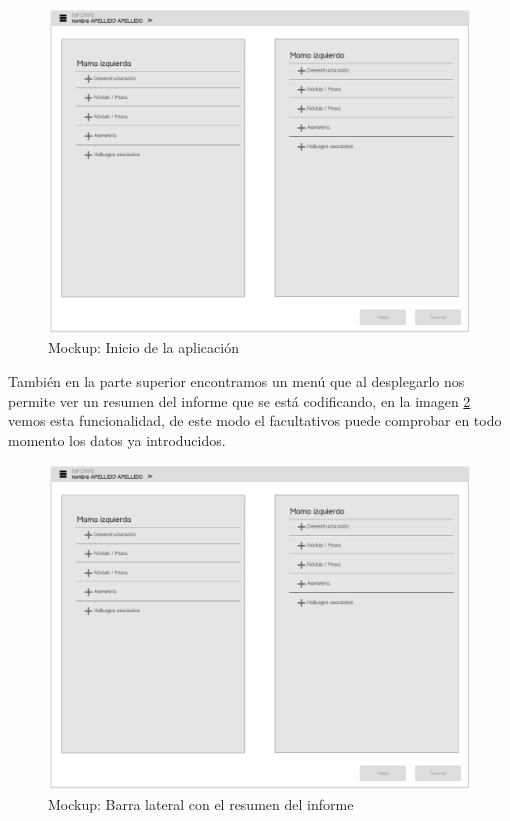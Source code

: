 \begin{figure}[ht]
\centering
\includegraphics[page=4,scale=0.4]{./imgs/mockup/mockup.pdf}
\caption{Mockup: Inicio de la aplicación}
\label{fig:mockup:ini}
\end{figure}

También en la parte superior encontramos un menú que al desplegarlo nos permite ver un resumen del informe que se está codificando, en la imagen \ref{fig:mockup:resumen} vemos esta funcionalidad, de este modo el facultativos puede comprobar en todo momento los datos ya introducidos.\par 

\begin{figure}[ht]
\centering
\includegraphics[page=13,scale=0.4]{./imgs/mockup/mockup.pdf}
\caption{Mockup: Barra lateral con el resumen del informe}
\label{fig:mockup:resumen}
\end{figure}

